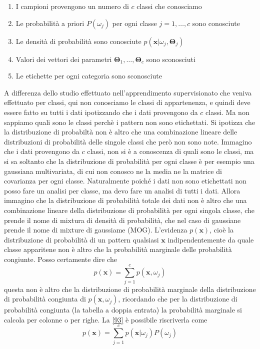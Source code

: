 \begin{enumerate}
\item I campioni provengono un numero di $c$ classi che conosciamo
\item Le probabilità a priori $P(\omega_j)$ per ogni classe $j=1, \dots, c$ sono conosciute
\item Le densità di probabilità sono conosciute $p(\mathbf{x}|\omega_j , \mathbf{\Theta}_j)$
\item Valori dei vettori dei parametri $\mathbf{\Theta}_1, \dots, \mathbf{\Theta}_c$ sono sconosciuti
\item Le etichette per ogni categoria sono sconosciute
\end{enumerate}
A differenza dello studio effettuato nell'apprendimento supervisionato che veniva effettuato per classi, qui non conosciamo le classi di appartenenza, e quindi deve essere fatto su tutti i dati ipotizzando che i dati provengono da $c$ classi. Ma non sappiamo quali sono le classi perchè i pattern non sono etichettati. Si ipotizza che la distribuzione di probabiltà non è altro che una combinazione lineare delle distribuzioni di probabilità delle singole classi che però non sono note. Immagino che i dati provengono da $c$ classi, non si è a conoscenza di quali sono le classi, ma si sa  soltanto che la distribuzione di probabilità per ogni classe è per esempio una gaussiana multivariata, di cui non conosco ne la media ne la matrice di covarianza per ogni classe. Naturalmente poiché i dati non sono etichettati non posso fare un analisi per classe, ma devo fare un analisi di tutti i dati. Allora immagino che la distribuzione di probabilità totale dei dati non è altro che una combinazione lineare della distribuzione di probabilità per ogni singola classe, che prende il nome di mixtura di densità di probabilità, che nel caso di gaussiane prende il nome di mixture di gaussiame (MOG). L'evidenza $p(\mathbf{x})$, cioè la distribuzione di probabilità di un pattern qualsiasi $\mathbf{x}$ indipendentemente  da quale classe apparitene non è altro che la probabilità marginale delle probabilità congiunte. Posso certamente dire che 
\begin{equation}\label{93}
p(\mathbf{x}) = \sum_{j=1}^c p(\mathbf{x}, \omega_j)
\end{equation}
questa non è altro che la distribuzione di probabilità marginale della distribuzione di probabilità congiunta di $p(\mathbf{x}, \omega_j)$, ricordando che per la distribuzione di probabilità congiunta (la tabella a doppia entrata) la probabilità marginale si calcola per colonne o per righe. La \ref{93} è possibile riscriverla come
\begin{equation}
p(\mathbf{x}) = \sum_{j=1}^c p(\mathbf{x}|\omega_j) P(\omega_j)
\end{equation}


